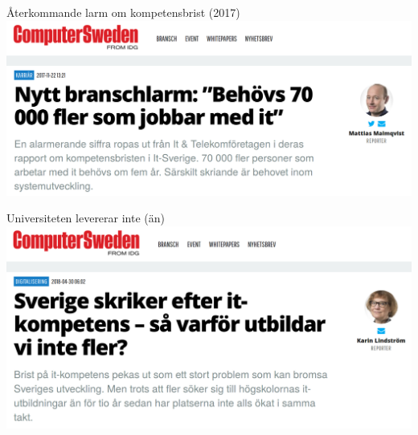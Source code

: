 \documentclass[aspectratio=169]{beamer}
\newenvironment{Slide}[1]%
  {\begin{frame}[environment=Slide]{#1}}
  {\end{frame}}%
\begin{document}
\begin{Slide}{Återkommande larm om kompetensbrist (2017)}
\includegraphics[height=0.75\textheight]{../../img/kompetenslarm-cs}
\end{Slide}




\begin{Slide}{Universiteten levererar inte (än)}
\includegraphics[height=0.75\textheight]{../../img/utbilda-fler}
\end{Slide}
\end{document}
